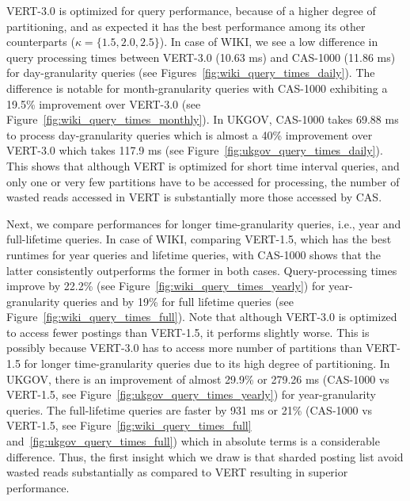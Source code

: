 VERT-3.0 is optimized for query performance, because of a higher
degree of partitioning, and as expected it has the best performance among its other counterparts ($\kappa = \{1.5, 2.0, 2.5\}$). In case of WIKI, we see a low difference in query
processing times between VERT-3.0 (10.63 ms) and CAS-1000 (11.86 ms) for day-granularity queries (see Figures~\ref{fig:wiki_query_times_daily}). The difference is notable for month-granularity queries with CAS-1000 exhibiting a 19.5\% improvement over VERT-3.0
 (see Figure~\ref{fig:wiki_query_times_monthly}). In UKGOV, CAS-1000 takes
69.88 ms to process day-granularity queries which is almost a 40\% improvement over VERT-3.0 which takes 117.9 ms (see Figure~\ref{fig:ukgov_query_times_daily}). This shows that although VERT is optimized for short time interval queries, and only one or very few partitions have to be accessed for processing, the number of wasted reads accessed in VERT is substantially more those accessed by CAS.

Next, we compare performances for longer time-granularity queries, i.e., year and full-lifetime queries. In
case of WIKI, comparing VERT-1.5, which has the best runtimes for year
queries and lifetime queries, with CAS-1000 shows that the latter
consistently outperforms the former in both cases. Query-processing times improve by
22.2\% (see Figure~\ref{fig:wiki_query_times_yearly}) for year-granularity queries and
by 19\% for full lifetime queries
(see Figure~\ref{fig:wiki_query_times_full}). Note that although VERT-3.0 is optimized to access fewer postings than VERT-1.5, it performs slightly worse. This is possibly because VERT-3.0 has to access more number of partitions than VERT-1.5 for longer time-granularity queries due to its high degree of partitioning. In UKGOV, there is an
improvement of almost 29.9\% or 279.26 ms (CAS-1000 vs
VERT-1.5, see Figure~\ref{fig:ukgov_query_times_yearly}) for year-granularity queries. The full-lifetime queries are faster by 931 ms or 21\% (CAS-1000 vs VERT-1.5, see Figure~\ref{fig:wiki_query_times_full}
and~\ref{fig:ukgov_query_times_full}) which in absolute terms is a considerable difference. Thus, the first insight which we draw is that sharded posting list avoid wasted reads substantially as compared to VERT resulting in superior performance.


